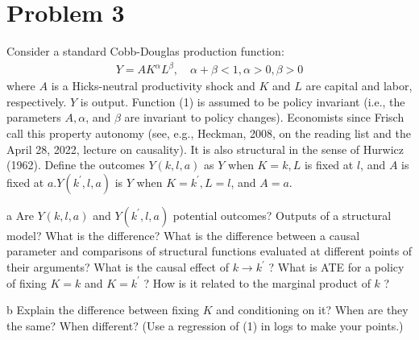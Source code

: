 \documentclass{article}
\begin{document}
\newpage

\section*{Problem 3}
Consider a standard Cobb-Douglas production function:
\begin{align*}
Y=A K^{\alpha} L^{\beta}, \quad \alpha+\beta<1, \alpha>0, \beta>0
\end{align*}
where $A$ is a Hicks-neutral productivity shock and $K$ and $L$ are capital and labor, respectively. $Y$ is output. Function (1) is assumed to be policy invariant (i.e., the parameters $A, \alpha$, and $\beta$ are invariant to policy changes). Economists since Frisch call this property autonomy (see, e.g., Heckman, 2008, on the reading list and the April 28, 2022, lecture on causality). It is also structural in the sense of Hurwicz (1962). Define the outcomes $Y(k, l, a)$ as $Y$ when $K=k, L$ is fixed at $l$, and $A$ is fixed at $a . Y\left(k^{\prime}, l, a\right)$ is $Y$ when $K=k^{\prime}, L=l$, and $A=a$.
 
\begin{problem}{a}
Are $Y(k, l, a)$ and $Y\left(k^{\prime}, l, a\right)$ potential outcomes? Outputs of a structural model? What is the difference? What is the difference between a causal parameter and comparisons of structural functions evaluated at different points of their arguments? What is the causal effect of $k \rightarrow k^{\prime}$ ? What is ATE for a policy of fixing $K=k$ and $K=k^{\prime}$ ? How is it related to the marginal product of $k$ ?
\end{problem}

\begin{problem}{b}
Explain the difference between fixing $K$ and conditioning on it? When are they the same? When different? (Use a regression of (1) in logs to make your points.)
\end{problem}

\newpage
\end{document}
